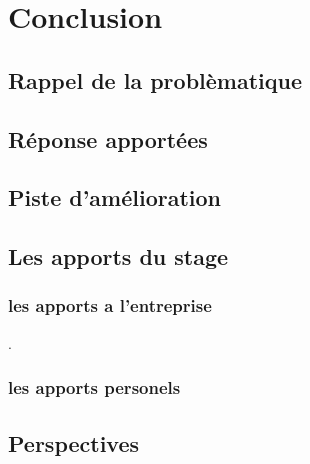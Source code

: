 \hypertarget{conclusion}{%
\chapter{Conclusion}\label{conclusion}}

\section{Rappel de la problèmatique}

\section{Réponse apportées}

\section{Piste d'amélioration}

\section{Les apports du stage}
\subsection{les apports a l'entreprise}
.
\subsection{les apports personels}


\section{Perspectives}
